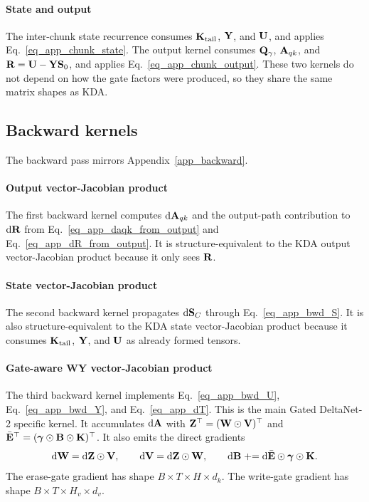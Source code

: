 \paragraph{State and output}
The inter-chunk state recurrence consumes ${\mathbf{K}}_{\mathrm{tail}}$, ${\mathbf{Y}}$, and ${\mathbf{U}}$, and applies Eq.~\ref{eq_app_chunk_state}. The output kernel consumes ${\mathbf{Q}}_{\gamma}$, ${\mathbf{A}}_{qk}$, and ${\mathbf{R}}={\mathbf{U}}-{\mathbf{Y}}{\mathbf{S}}_0$, and applies Eq.~\ref{eq_app_chunk_output}. These two kernels do not depend on how the gate factors were produced, so they share the same matrix shapes as KDA.

\subsection{Backward kernels}
\label{app_backward_kernels}

The backward pass mirrors Appendix~\ref{app_backward}.

\paragraph{Output vector-Jacobian product}
The first backward kernel computes $\mathrm{d}{\mathbf{A}}_{qk}$ and the output-path contribution to $\mathrm{d}{\mathbf{R}}$ from Eq.~\ref{eq_app_daqk_from_output} and Eq.~\ref{eq_app_dR_from_output}. It is structure-equivalent to the KDA output vector-Jacobian product because it only sees ${\mathbf{R}}$.

\paragraph{State vector-Jacobian product}
The second backward kernel propagates $\mathrm{d}{\mathbf{S}}_C$ through Eq.~\ref{eq_app_bwd_S}. It is also structure-equivalent to the KDA state vector-Jacobian product because it consumes ${\mathbf{K}}_{\mathrm{tail}}$, ${\mathbf{Y}}$, and ${\mathbf{U}}$ as already formed tensors.

\paragraph{Gate-aware WY vector-Jacobian product}
The third backward kernel implements Eq.~\ref{eq_app_bwd_U}, Eq.~\ref{eq_app_bwd_Y}, and Eq.~\ref{eq_app_dT}. This is the main Gated DeltaNet-2 specific kernel. It accumulates $\mathrm{d}{\mathbf{A}}$ with ${\mathbf{Z}}^\top=({\mathbf{W}}\odot{\mathbf{V}})^\top$ and $\bar{{\mathbf{E}}}^\top=(\boldsymbol{\gamma}\odot{\mathbf{B}}\odot{\mathbf{K}})^\top$. It also emits the direct gradients
\begin{align}
    \mathrm{d}{\mathbf{W}}
    =
    \mathrm{d}{\mathbf{Z}}\odot{\mathbf{V}},
    \qquad
    \mathrm{d}{\mathbf{V}}
    =
    \mathrm{d}{\mathbf{Z}}\odot{\mathbf{W}},
    \qquad
    \mathrm{d}{\mathbf{B}}
    \mathrel{+}=
    \mathrm{d}\bar{{\mathbf{E}}}\odot\boldsymbol{\gamma}\odot{\mathbf{K}} .
\label{eq_app_kernel_gate_grads}
\end{align}
The erase-gate gradient has shape $B\times T\times H\times d_k$. The write-gate gradient has shape $B\times T\times H_v\times d_v$.

